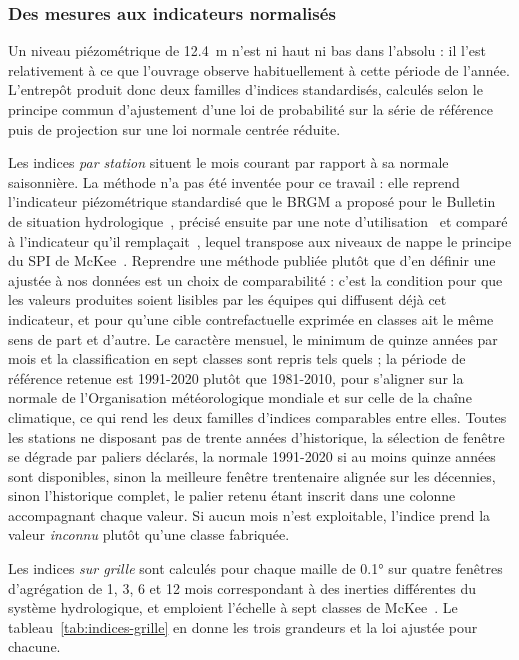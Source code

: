 \subsubsection{Des mesures aux indicateurs normalisés}

Un niveau piézométrique de \SI{12,4}{\metre} n'est ni haut ni bas dans l'absolu : il l'est relativement à ce que l'ouvrage observe habituellement à cette période de l'année. L'entrepôt produit donc deux familles d'indices standardisés, calculés selon le principe commun d'ajustement d'une loi de probabilité sur la série de référence puis de projection sur une loi normale centrée réduite.

Les indices \emph{par station} situent le mois courant par rapport à sa normale saisonnière. La méthode n'a pas été inventée pour ce travail : elle reprend l'indicateur piézométrique standardisé que le BRGM a proposé pour le Bulletin de situation hydrologique~\cite{seguin2015ips}, précisé ensuite par une note d'utilisation~\cite{klinka2016ips} et comparé à l'indicateur qu'il remplaçait~\cite{seguin2016ipsbilan}, lequel transpose aux niveaux de nappe le principe du SPI de McKee~\cite{mckee1993spi}. Reprendre une méthode publiée plutôt que d'en définir une ajustée à nos données est un choix de comparabilité : c'est la condition pour que les valeurs produites soient lisibles par les équipes qui diffusent déjà cet indicateur, et pour qu'une cible contrefactuelle exprimée en classes ait le même sens de part et d'autre. Le caractère mensuel, le minimum de quinze années par mois et la classification en sept classes sont repris tels quels ; la période de référence retenue est 1991-2020 plutôt que 1981-2010, pour s'aligner sur la normale de l'Organisation météorologique mondiale et sur celle de la chaîne climatique, ce qui rend les deux familles d'indices comparables entre elles. Toutes les stations ne disposant pas de trente années d'historique, la sélection de fenêtre se dégrade par paliers déclarés, la normale 1991-2020 si au moins quinze années sont disponibles, sinon la meilleure fenêtre trentenaire alignée sur les décennies, sinon l'historique complet, le palier retenu étant inscrit dans une colonne accompagnant chaque valeur. Si aucun mois n'est exploitable, l'indice prend la valeur \emph{inconnu} plutôt qu'une classe fabriquée.

Les indices \emph{sur grille} sont calculés pour chaque maille de \ang{0.1} sur quatre fenêtres d'agrégation de 1, 3, 6 et 12 mois correspondant à des inerties différentes du système hydrologique, et emploient l'échelle à sept classes de McKee~\cite{mckee1993spi}. Le tableau~\ref{tab:indices-grille} en donne les trois grandeurs et la loi ajustée pour chacune.

